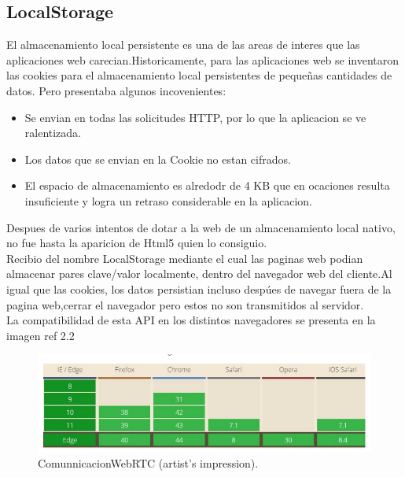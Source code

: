 \subsection{LocalStorage}
El almacenamiento local persistente es una de las areas de interes que las aplicaciones web carecian.Historicamente, para las aplicaciones web se inventaron las cookies para el almacenamiento local persistentes de pequeñas cantidades de datos. Pero presentaba algunos  incovenientes:
\begin{itemize}
\item Se envian en todas las solicitudes HTTP, por lo que la aplicacion se ve ralentizada.
\item Los datos que se envian en la Cookie no estan cifrados.
\item El espacio de almacenamiento es alredodr de 4 KB que en ocaciones resulta insuficiente y logra un retraso considerable en la aplicacion.
\end{itemize}
Despues de varios intentos de dotar a la web de un almacenamiento local nativo, no fue hasta la aparicion de Html5 	quien lo consiguio.
\\Recibio del nombre LocalStorage mediante el cual las paginas web podian almacenar pares clave/valor localmente, dentro del  navegador web del cliente.Al igual que las cookies, los datos persistian incluso despúes de navegar fuera de la pagina web,cerrar el navegador pero estos no son transmitidos al servidor.
\\La compatibilidad de esta API en los distintos navegadores se presenta en la imagen ref 2.2
\begin{figure}[!h]
\centering
\includegraphics[width=0.6\linewidth]{Figures/compatibilidadLocalStorage}
\decoRule
\caption[An Electron]{ComunnicacionWebRTC (artist's impression).}
\label{fig:ComunnicacionWebRTC}
\end{figure}
